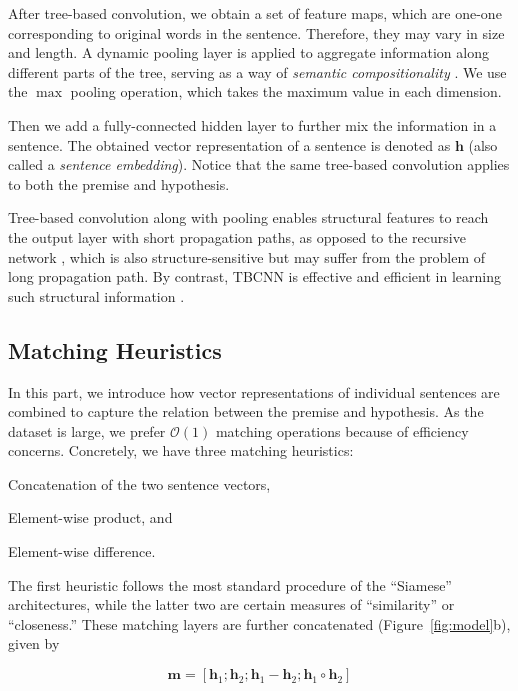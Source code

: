 \documentclass[11pt]{article}
\begin{document}
 After tree-based convolution, we obtain a set of feature maps, which are one-one corresponding to original words in the sentence. Therefore, they may vary in size and length. A dynamic pooling layer is applied to aggregate information along different parts of the tree, serving as a way of \textit{semantic compositionality} \cite{CNN:NIPS}. We use the $\max$ pooling operation, which takes the maximum value in each dimension. 


Then we add a fully-connected hidden layer to further mix the information in a sentence. The obtained vector representation of a sentence is denoted as $\bm h$ (also called a \textit{sentence embedding}). Notice that the same tree-based convolution applies to both the  premise and hypothesis.

Tree-based convolution along with pooling enables structural features to reach the output layer with short propagation paths, as opposed to the recursive network \cite{recursive}, which is also structure-sensitive but may suffer from the problem of long propagation path. By contrast, TBCNN is effective and efficient in learning such structural information \cite{sentenceTBCNN}.


\subsection{Matching Heuristics}\label{ss:matching}

\vspace{-.1cm}
In this part, we introduce how vector representations of individual sentences are combined to capture the relation between the premise and hypothesis. As the dataset is large, we prefer $\mathcal{O}(1)$ matching operations because of efficiency concerns.  Concretely, we have three matching heuristics:
\begin{compactitem}
\item Concatenation of the two sentence vectors,
\item Element-wise product, and
\item Element-wise difference.
\end{compactitem}
The first heuristic follows the most standard procedure of the ``Siamese'' architectures, while the latter two are certain measures of ``similarity'' or ``closeness.''
These matching layers are further concatenated (Figure~\ref{fig:model}b), given by 

\vspace{-.3cm plus 0cm minus 0cm}
$$\bm m=[\bm h_1; \bm h_2; \bm h_1-\bm h_2;\bm h_1\circ\bm h_2]$$
\vspace{-.5cm plus 0cm minus 0cm}
\end{document}
